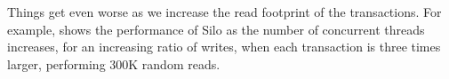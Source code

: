 
Things get even worse as we increase the read footprint of the transactions. For example,  shows the performance of Silo as the number of concurrent threads increases, for an increasing ratio of writes, when each transaction is three times larger, performing 300K random reads.




